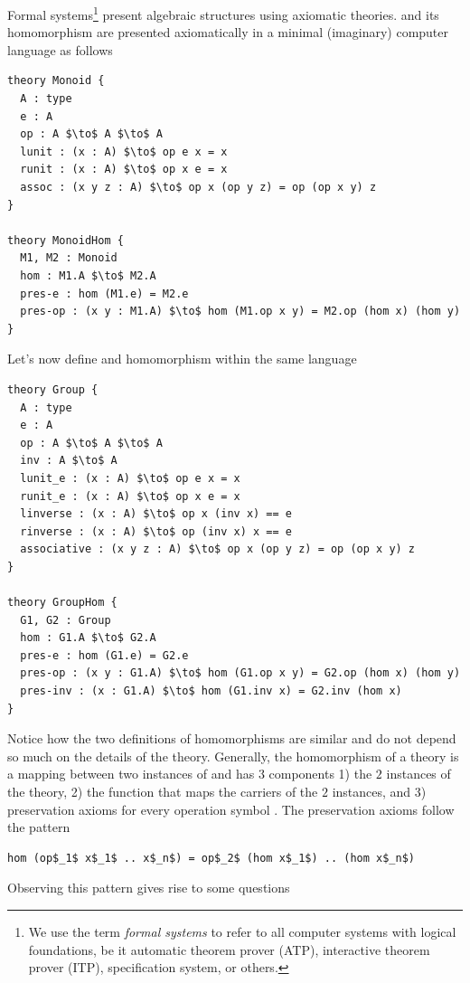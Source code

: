 Formal systems\footnote{We use the term \emph{formal systems} to refer to all computer systems with logical foundations, be it automatic theorem prover (ATP), interactive theorem prover (ITP), specification system, or others.} present algebraic structures using axiomatic theories.  and its homomorphism are presented axiomatically in a minimal (imaginary) computer language as follows 
\begin{lstlisting}[mathescape]
theory Monoid { 
  A : type 
  e : A
  op : A $\to$ A $\to$ A
  lunit : (x : A) $\to$ op e x = x 
  runit : (x : A) $\to$ op x e = x 
  assoc : (x y z : A) $\to$ op x (op y z) = op (op x y) z
}

theory MonoidHom { 
  M1, M2 : Monoid  
  hom : M1.A $\to$ M2.A 
  pres-e : hom (M1.e) = M2.e
  pres-op : (x y : M1.A) $\to$ hom (M1.op x y) = M2.op (hom x) (hom y) 
}
\end{lstlisting}
Let's now define  and  homomorphism within the same language
\begin{lstlisting}[mathescape]
theory Group {
  A : type 
  e : A
  op : A $\to$ A $\to$ A
  inv : A $\to$ A
  lunit_e : (x : A) $\to$ op e x = x
  runit_e : (x : A) $\to$ op x e = x
  linverse : (x : A) $\to$ op x (inv x) == e
  rinverse : (x : A) $\to$ op (inv x) x == e
  associative : (x y z : A) $\to$ op x (op y z) = op (op x y) z
}

theory GroupHom { 
  G1, G2 : Group 
  hom : G1.A $\to$ G2.A
  pres-e : hom (G1.e) = G2.e
  pres-op : (x y : G1.A) $\to$ hom (G1.op x y) = G2.op (hom x) (hom y)
  pres-inv : (x : G1.A) $\to$ hom (G1.inv x) = G2.inv (hom x)
}
\end{lstlisting}
Notice how the two definitions of homomorphisms are similar and do not depend so much on the details of the theory. Generally, the homomorphism of a theory  is a mapping between two instances of  and has $3$ components 1) the $2$ instances of the theory, 2) the function  that maps the carriers of the $2$ instances, and 3) preservation axioms  for every operation symbol . The preservation axioms follow the pattern
\begin{lstlisting}[mathescape]
hom (op$_1$ x$_1$ .. x$_n$) = op$_2$ (hom x$_1$) .. (hom x$_n$)
\end{lstlisting}
Observing this pattern gives rise to some questions
 
